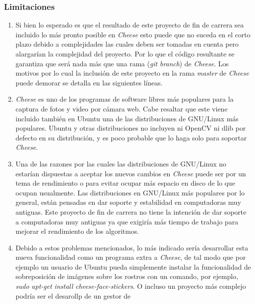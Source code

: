 \documentclass[a4paper,openright,12pt]{report}
\begin{document}
\subsubsection{Limitaciones}

\begin{enumerate}
    \item Si bien lo esperado es que el resultado de este proyecto de fin de
        carrera sea incluido lo más pronto posible en \textit{Cheese} esto puede
        que no suceda en el corto plazo debido a complejidades las cuales deben
        ser tomadas en cuenta pero alargarían la complejidad del proyecto. Por
        lo que el código resultante se garantiza que será nada más que una rama
        (\textit{git branch}) de \textit{Cheese}. Los motivos por lo cual la
        inclusión de este proyecto en la rama \textit{master} de \textit{Cheese}
        puede demorar se detalla en las siguientes líneas.
    \item \textit{Cheese} es uno de los programas de software libres más
        populares para la captura de fotos y video por cámara web. Cabe
        resaltar que este viene incluido también en Ubuntu una de las
        distribuciones de GNU/Linux más populares. Ubuntu y otras distribuciones
        no incluyen ni OpenCV ni dlib por defecto en su distribución, y es poco
        probable que lo haga solo para soportar \textit{Cheese}.
    \item Una de las razones por las cuales las distribuciones de GNU/Linux no
        estarían dispuestas a aceptar los nuevos cambios en \textit{Cheese}
        puede ser por un tema de rendimiento o para evitar ocupar más espacio en
        disco de lo que ocupan usualmente. Las distribuciones en GNU/Linux más
        populares por lo general, están pensadas en dar soporte y estabilidad
        en computadoras muy antiguas. Este proyecto de fin de carrera no tiene
        la intención de dar soporte a computadoras muy antiguas ya que exigiría
        más tiempo de trabajo para mejorar el rendimiento de los algoritmos.
    \item Debido a estos problemas mencionados, lo más indicado sería
        desarrollar esta nueva funcionalidad como un programa extra a
        \textit{Cheese}, de tal modo que por ejemplo un usuario de Ubuntu pueda
        simplemente instalar la funcionalidad de sobreposición de imágenes sobre
        los rostros con un comando, por ejemplo,
        \textit{sudo apt-get install cheese-face-stickers}. O incluso un
        proyecto más complejo podría ser el desarollp de un gestor de

\end{enumerate}
\end{document}
